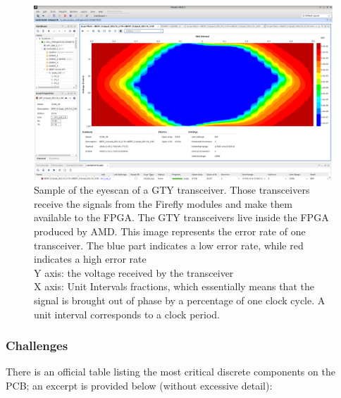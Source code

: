 \begin{figure}[H]
\centering
\includegraphics[width=\textwidth]{images/contributions/eyescan.png}
\caption[Sample of the eyescan of a GTY transceiver]{Sample of the eyescan of a GTY transceiver. Those transceivers receive the signals from the Firefly \protect\cite{firefly-optical-transceiver} modules and make them available to the FPGA. The GTY transceivers live inside the FPGA produced by AMD. This image represents the error rate of one transceiver. The blue part indicates a low error rate, while red indicates a high error rate\\
Y axis: the voltage received by the transceiver\\
X axis: Unit Intervals fractions, which essentially means that the signal is brought out of phase by a percentage of one clock cycle. A unit interval corresponds to a clock period.}
\label{fig:eyescan-test}
\end{figure}


\subsubsection{Challenges}

There is an official table listing the most critical discrete components on the \ac{PCB}; an excerpt is provided below (without excessive detail):

